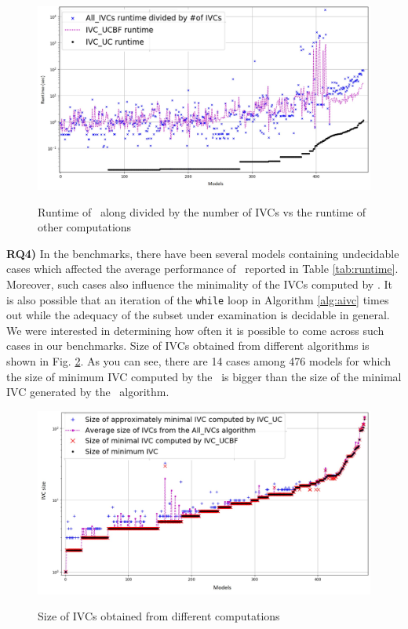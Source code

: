 \begin{figure}
 \centering
  \includegraphics[width=\textwidth]{figs/ratio.jpg}
  \label{fig:ratio}
  \vspace{-0.2in}
  \caption{Runtime of \aivcalg ~along divided by the number of IVCs vs the runtime of other computations}
\end{figure}

\vspace{0.1in}
\textbf{RQ4)} In the benchmarks, there have been
several models containing undecidable cases which affected the average
performance of \aivcalg ~reported in Table \ref{tab:runtime}. Moreover, such cases also influence the minimality of the IVCs computed by \aivcalg. It is also possible that an iteration of
the \texttt{while} loop in Algorithm \ref{alg:aivc} times out while
the adequacy of the subset under examination is decidable in general.
We were interested in determining how often it is possible to come across such cases in our benchmarks. Size of IVCs obtained from different algorithms is shown in Fig. \ref{fig:min}.
As you can see, there are 14 cases among 476 models for which the size of
 minimum IVC computed by the \aivcalg ~is bigger than the size of the minimal IVC
 generated by the \ucbfalg ~algorithm.
 \begin{figure}
 \centering
  \includegraphics[width=\textwidth]{figs/min.jpg}
  \label{fig:min}
  \vspace{-0.2in}
  \caption{Size of IVCs obtained from different computations}
\end{figure}
